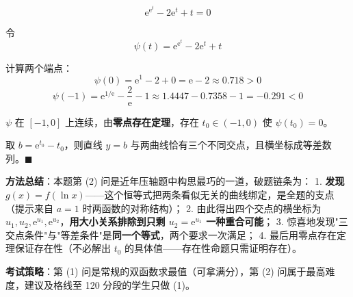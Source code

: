 \[\mathrm e^{\mathrm e^{t}}-2\mathrm e^{t}+t=0\]

令
\[\psi(t)=\mathrm e^{\mathrm e^{t}}-2\mathrm e^{t}+t\]

计算两个端点：
\[\psi(0)=\mathrm e^{1}-2+0=\mathrm e-2\approx0.718>0\]
\[\psi(-1)=\mathrm e^{1/\mathrm e}-\frac2{\mathrm e}-1\approx1.4447-0.7358-1=-0.291<0\]

$\psi$ 在 $[-1,0]$ 上连续，由\textbf{零点存在定理}，存在 $t_0\in(-1,0)$ 使 $\psi\left(t_0\right)=0$。

取 $b=\mathrm e^{t_0}-t_0$，则直线 $y=b$ 与两曲线恰有三个不同交点，且横坐标成等差数列。$\blacksquare$

\begin{gktip}
\textbf{方法总结}：本题第 (2) 问是近年压轴题中构思最巧的一道，破题链条为：
1. \textbf{发现 $g(x)=f(\ln x)$}——这个恒等式把两条看似无关的曲线绑定，是全题的支点（提示来自 $a=1$ 时两函数的对称结构）；
2. 由此得出四个交点的横坐标为 $u_1,u_2,\mathrm e^{u_1},\mathrm e^{u_2}$，\textbf{用大小关系排除到只剩 $u_2=\mathrm e^{u_1}$ 一种重合可能}；
3. 惊喜地发现"三交点条件"与"等差条件"是\textbf{同一个等式}，两个要求一次满足；
4. 最后用零点存在定理保证存在性（不必解出 $t_0$ 的具体值——存在性命题只需证明存在）。

\textbf{考试策略}：第 (1) 问是常规的双函数求最值（可拿满分），第 (2) 问属于最高难度，建议及格线至 120 分段的学生只做 (1)。
\end{gktip}

